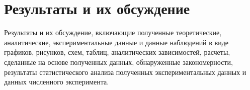 \chapter{Результаты и их обсуждение} \label{ch:results}

Результаты и их обсуждение, включающие полученные теоретические, аналитические,
экспериментальные данные и данные наблюдений в виде графиков, рисунков, схем,
таблиц, аналитических зависимостей, расчеты, сделанные на основе полученных
данных, обнаруженные закономерности, результаты статистического анализа
полученных экспериментальных данных и данных численного эксперимента.

